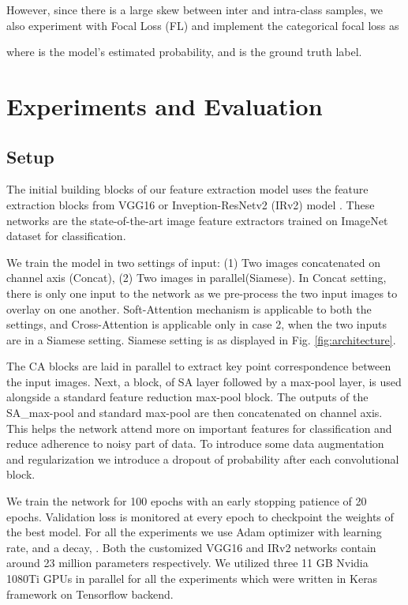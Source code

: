 \documentclass[a4paper,conference]{IEEEtran}
\begin{document}
However, since there is a large skew between inter and intra-class samples, we also experiment with Focal Loss (FL) \cite{lin_focal_2020} and implement the categorical focal loss  as

where 
  is the model's estimated probability, and  is the ground truth label.
 
\section{Experiments and Evaluation}
\subsection{Setup}
The initial building blocks of our feature extraction model uses the feature extraction blocks from VGG16 \cite{vgg16} or Inveption-ResNetv2 (IRv2) model \cite{szegedy_inception-v4_2017}. These networks are the state-of-the-art image feature extractors trained on ImageNet \cite{imagenet} dataset for classification. 

We train the model in two settings of input: (1) Two images concatenated on channel axis (Concat), (2) Two images in parallel(Siamese).
In Concat setting, there is only one input to the network as we pre-process the two input images to overlay on one another. Soft-Attention mechanism is applicable to both the settings, and Cross-Attention is applicable only in case 2, when the two inputs are in a Siamese setting. Siamese setting is as displayed in Fig. \ref{fig:architecture}. 

The CA blocks are laid in parallel to extract key point correspondence between the input images. Next, a block, of SA layer followed by a  max-pool layer, is used alongside a standard feature reduction  max-pool block.
The outputs of the SA\_max-pool and standard max-pool are then concatenated on channel axis.
This helps the network attend more on important features for classification and reduce adherence to noisy part of data. 
To introduce some data augmentation and regularization we introduce a dropout of  probability after each convolutional block.

\indent We train the network for 100 epochs with an early stopping patience of 20 epochs. Validation loss is monitored at every epoch to checkpoint the weights of the best model. For all the experiments we use Adam optimizer with learning rate,  and a decay, . Both the customized VGG16 and IRv2 networks contain around 23 million parameters respectively. We utilized three 11 GB Nvidia 1080Ti GPUs in parallel for all the experiments which were written in Keras framework on Tensorflow backend.
\end{document}
